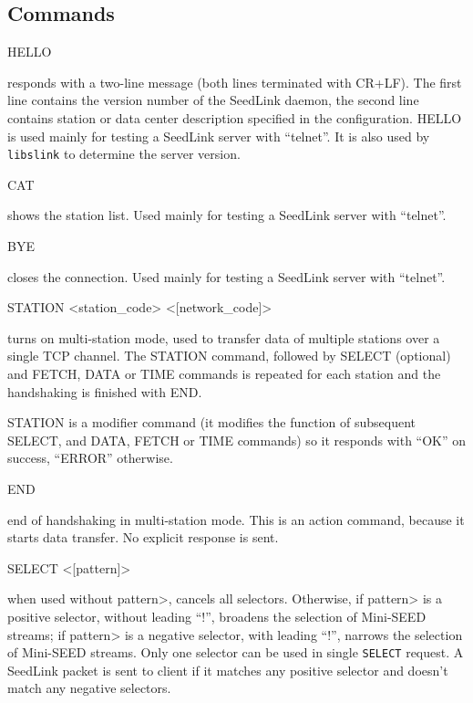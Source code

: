 \documentclass[11pt,a4paper,titlepage]{article}
\begin{document}
\subsection{Commands} \label{commands}

\begin{interface}

\item HELLO

responds with a two-line message (both lines terminated with
CR+LF). The first line contains the version number of the SeedLink
daemon, the second line contains station or data center description
specified in the configuration. HELLO is used mainly for testing a
SeedLink server with ``telnet''.  It is also used by \verb+libslink+
to determine the server version.

\item CAT

shows the station list. Used mainly for testing a SeedLink server with
``telnet''.

\item BYE

closes the connection. Used mainly for testing a SeedLink server with
``telnet''.

\item STATION <station_code> <[network_code]>

turns on multi-station mode, used to transfer data of multiple
stations over a single TCP channel. The STATION command, followed by
SELECT (optional) and FETCH, DATA or TIME commands is repeated for
each station and the handshaking is finished with END.

STATION is a modifier command (it modifies the function of subsequent
SELECT, and DATA, FETCH or TIME commands) so it responds with ``OK'' on
success, ``ERROR'' otherwise.

\item END

end of handshaking in multi-station mode. This is an action command,
because it starts data transfer. No explicit response is sent.

\item SELECT <[pattern]>

when used without \<pattern>, cancels all selectors. Otherwise, if
\<pattern> is a positive selector, without leading ``!'', broadens the
selection of Mini-SEED streams; if \<pattern> is a negative selector,
with leading ``!'', narrows the selection of Mini-SEED streams. Only
one selector can be used in single \verb+SELECT+ request. A SeedLink
packet is sent to client if it matches any positive selector and
doesn't match any negative selectors.


\end{interface}
\end{document}
